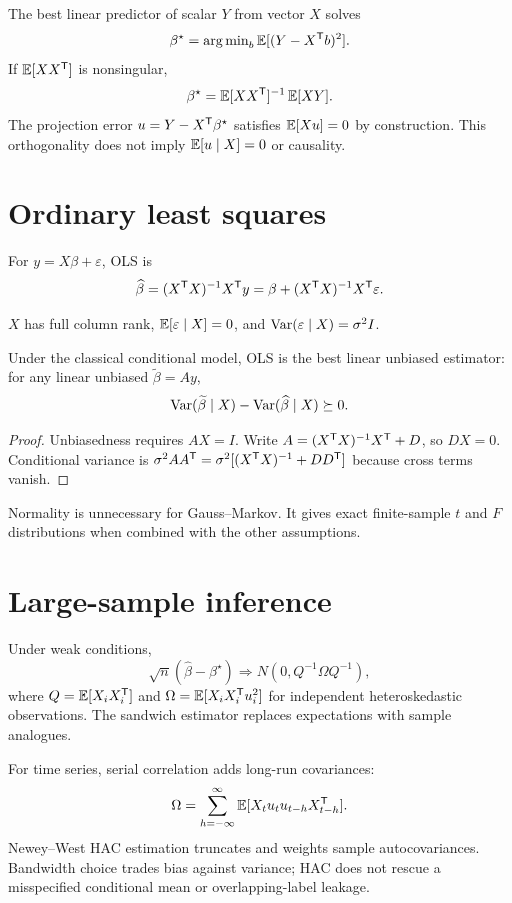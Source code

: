 The best linear predictor of scalar $Y$ from vector $X$ solves
\[
\beta^\star=\operatorname{arg\,min}_b\operatorname{\mathbb E}[(Y-X^\mathsf T b)^2].
\]
If $\operatorname{\mathbb E}[XX^\mathsf T]$ is nonsingular,
\[
\beta^\star=\operatorname{\mathbb E}[XX^\mathsf T]^{-1}\operatorname{\mathbb E}[XY].
\]
The projection error $u=Y-X^\mathsf T\beta^\star$ satisfies
$\operatorname{\mathbb E}[Xu]=0$ by construction. This orthogonality does not imply
$\operatorname{\mathbb E}[u\mid X]=0$ or causality.

\section{Ordinary least squares}

For $y=X\beta+\varepsilon$, OLS is
\[
\widehat\beta=(X^\mathsf T X)^{-1}X^\mathsf T y
=\beta+(X^\mathsf T X)^{-1}X^\mathsf T\varepsilon.
\]

\begin{assumption}
$X$ has full column rank, $\operatorname{\mathbb E}[\varepsilon\mid X]=0$, and
$\operatorname{Var}(\varepsilon\mid X)=\sigma^2I$.
\end{assumption}

\begin{theorem}
Under the classical conditional model, OLS is the best linear unbiased estimator:
for any linear unbiased $\widetilde\beta=Ay$,
\[
\operatorname{Var}(\widetilde\beta\mid X)-\operatorname{Var}(\widehat\beta\mid X)\succeq0.
\]
\end{theorem}
\begin{proof}
Unbiasedness requires $AX=I$. Write
$A=(X^\mathsf T X)^{-1}X^\mathsf T+D$, so $DX=0$. Conditional variance is
$\sigma^2AA^\mathsf T
=\sigma^2[(X^\mathsf T X)^{-1}+DD^\mathsf T]$ because cross terms vanish.
\end{proof}

Normality is unnecessary for Gauss--Markov. It gives exact finite-sample
$t$ and $F$ distributions when combined with the other assumptions.

\section{Large-sample inference}

Under weak conditions,
\[
\sqrt n(\widehat\beta-\beta^\star)
\Rightarrow N(0,Q^{-1}\Omega Q^{-1}),
\]
where $Q=\operatorname{\mathbb E}[X_iX_i^\mathsf T]$ and
$\Omega=\operatorname{\mathbb E}[X_iX_i^\mathsf T u_i^2]$ for independent heteroskedastic observations.
The sandwich estimator replaces expectations with sample analogues.

For time series, serial correlation adds long-run covariances:
\[
\Omega=\sum_{h=-\infty}^{\infty}
\operatorname{\mathbb E}[X_tu_tu_{t-h}X_{t-h}^\mathsf T].
\]
Newey--West HAC estimation truncates and weights sample autocovariances. Bandwidth
choice trades bias against variance; HAC does not rescue a misspecified conditional
mean or overlapping-label leakage.

